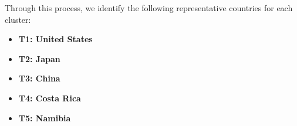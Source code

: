 Through this process, we identify the following representative countries for each cluster:
\begin{itemize}
    \item \textbf{T1: United States}
    ~\cite{
        congress-website,
        nist-website,
        dhs-website,
        sec-website,
        whitehouse-website,
        investigatory-powers-act-2016,
        ncsc-uk,
        telecom-security-act-2021,
        uk-cyber-security-requirements-2024,
        uk-cybersecurity-timeline-2024}
    \item \textbf{T2: Japan}
    ~\cite{
        it-basic-law-japan,
        ppc-legal-japan,
        nisc-japan,
        mofa-japan,
        japan-law-translation,
        cs-strategy-2015-japan,
        cs-strategy-2018-japan,
        telecom-business-act-japan,
        cs-strategy-2021-japan}
    \item \textbf{T3: China}
    ~\cite{
        international-cybercrime,
        cybersecurity-law-china,
        internet-censorship-china,
        china-data-security-regulations,
        cryptography-law-china}
    \item \textbf{T4: Costa Rica}
    ~\cite{
        costa-rica-cybersecurity-strategy,
        costa-rica-pop-up}
    \item \textbf{T5: Namibia}
    ~\cite{
        namibia-pop-up,
        namibia-digital-odyssey,
        namibia-cybersecurity-strategy}
\end{itemize}

